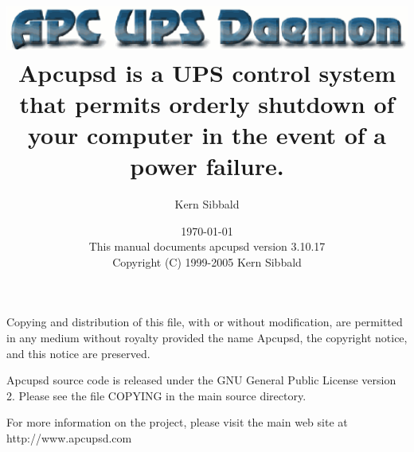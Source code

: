\documentclass[11pt,a4paper]{report}
\begin{document}
\sloppy

\parskip 10pt
\parindent 0pt

\title{\includegraphics{./apcupsd.eps} \\ \bigskip
   \Large{Apcupsd is a UPS control system that permits
   orderly shutdown of your
   computer in the event of a power failure.} }
\author{Kern Sibbald}
\date{\vspace{2.0in}\today \\
      This manual documents apcupsd version 3.10.17 \\
Copyright (C) 1999-2005 Kern Sibbald }


\maketitle

Copying and distribution of this file, with or without
modification, are permitted in any medium without royalty
provided the name Apcupsd, the copyright notice, and this notice
are preserved.

Apcupsd source code is released under the GNU General Public
License version 2. Please see the file COPYING in the main source
directory.

For more information on the project, please visit the main web
site at http://www.apcupsd.com

\clearpage
\tableofcontents
\clearpage
\listoffigures
\clearpage
\listoftables
\clearpage


\printindex
\end{document}
